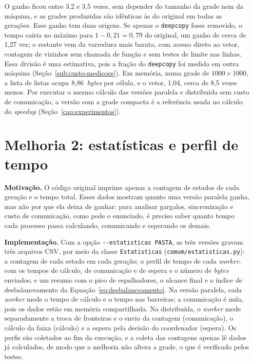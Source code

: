 O ganho ficou entre 3,2 e 3,5 vezes, sem depender do tamanho da grade nem da máquina, e as grades produzidas são idênticas às do original em todas as gerações. Esse ganho tem duas origens. Se apenas o \texttt{deepcopy} fosse removido, o tempo cairia no máximo para $1 - 0{,}21 = 0{,}79$ do original, um ganho de cerca de 1,27 vez; o restante vem da varredura mais barata, com acesso direto ao vetor, contagem de vizinhos sem chamada de função e sem testes de limite nas linhas. Essa divisão é uma estimativa, pois a fração do \texttt{deepcopy} foi medida em outra máquina (Seção~\ref{sub:custo-medicoes}). Em memória, numa grade de $1000 \times 1000$, a lista de listas ocupa 8,86~\textit{bytes} por célula, e o vetor, 1,04, cerca de 8,5 vezes menos. Por executar o mesmo cálculo das versões paralela e distribuída sem custo de comunicação, a versão com a grade compacta é a referência usada no cálculo do \textit{speedup} (Seção~\ref{cap:experimentos}).

\section{Melhoria 2: estatísticas e perfil de tempo}\label{sec:melhoria-estatisticas}

\textbf{Motivação.} O código original imprime apenas a contagem de estados de cada geração e o tempo total. Esses dados mostram quanto uma versão paralela ganha, mas não por que ela deixa de ganhar: para analisar gargalos, sincronização e custo de comunicação, como pede o enunciado, é preciso saber quanto tempo cada processo passa calculando, comunicando e esperando os demais.

\textbf{Implementação.} Com a opção \texttt{-{}-estatisticas PASTA}, as três versões gravam três arquivos CSV, por meio da classe \texttt{Estatisticas} (\texttt{comum/estatisticas.py}): a contagem de cada estado em cada geração; o perfil de tempo de cada \textit{worker}, com os tempos de cálculo, de comunicação e de espera e o número de \textit{bytes} enviados; e um resumo com o pico de espalhadores, o alcance final e o índice de desbalanceamento da Equação~\ref{eq:desbalanceamento}. Na versão paralela, cada \textit{worker} mede o tempo de cálculo e o tempo nas barreiras; a comunicação é nula, pois os dados estão em memória compartilhada. Na distribuída, o \textit{worker} mede separadamente a troca de fronteiras e o envio da contagem (comunicação), o cálculo da faixa (cálculo) e a espera pela decisão do coordenador (espera). Os perfis são coletados ao fim da execução, e a coleta das contagens apenas lê dados já calculados, de modo que a melhoria não altera a grade, o que é verificado pelos testes.


